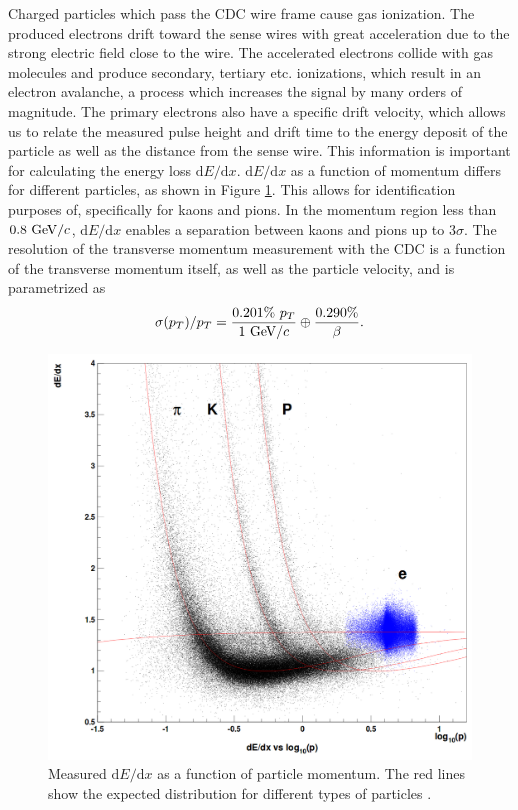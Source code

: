 Charged particles which pass the CDC wire frame cause gas ionization. The produced electrons drift toward the sense wires with great acceleration due to the strong electric field close to the wire. The accelerated electrons collide with gas molecules and produce secondary, tertiary etc. ionizations, which result in an electron avalanche, a process which increases the signal by many orders of magnitude. The primary electrons also have a specific drift velocity, which allows us to relate the measured pulse height and drift time to the energy deposit of the particle as well as the distance from the sense wire. This information is important for calculating the energy loss $\mathrm{d}E/\mathrm{d}x$. $\mathrm{d}E/\mathrm{d}x$ as a function of momentum differs for different particles, as shown in Figure \ref{fig:dEdx}. This allows for identification purposes of, specifically for kaons and pions. In the momentum region less than $0.8\mathrm{~GeV}/c$, $\mathrm{d}E/\mathrm{d}x$ enables a separation between kaons and pions up to $3\sigma$. The resolution of the transverse momentum measurement with the CDC is a function of the transverse momentum itself, as well as the particle velocity, and is parametrized as
\begin{equation}
\sigma(p_T)/p_T = \frac{0.201\%~p_T}{1\mathrm{~GeV}/c} \oplus \frac{0.290\%}{\beta}.
\end{equation}

\begin{figure}[H]
	\centering
	\captionsetup{width=0.8\linewidth}
	\includegraphics[width=0.6\linewidth]{fig/setup/dEdx}
	\caption{Measured $\mathrm{d}E/\mathrm{d}x$ as a function of particle momentum. The red lines show the expected distribution for different types of particles \cite{ABASHIAN2002117}.}
	\label{fig:dEdx}
\end{figure}


